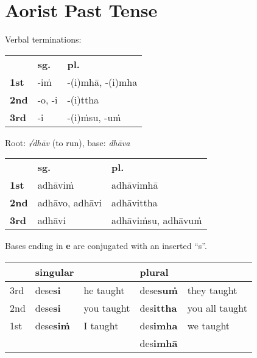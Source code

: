 \documentclass[a4paper]{memoir}
\begin{document}
\section{Aorist Past Tense}
\label{sec:orgbe4d456}

{\centering\par
\begin{multicols}{2}

Verbal terminations:

\begin{center}
\begin{tabular}{lll}
 & \textbf{sg.} & \textbf{pl.}\\[0pt]
\textbf{1st} & -iṁ & -(i)mhā, -(i)mha\\[0pt]
\textbf{2nd} & -o, -i & -(i)ttha\\[0pt]
\textbf{3rd} & -i & -(i)ṁsu, -uṁ\\[0pt]
\end{tabular}
\end{center}

\columnbreak

Root: \emph{√dhāv} (to run), base: \emph{dhāva}

\begin{center}
\begin{tabular}{lll}
 & \textbf{sg.} & \textbf{pl.}\\[0pt]
\textbf{1st} & adhāviṁ & adhāvimhā\\[0pt]
\textbf{2nd} & adhāvo, adhāvi & adhāvittha\\[0pt]
\textbf{3rd} & adhāvi & adhāviṁsu, adhāvuṁ\\[0pt]
\end{tabular}
\end{center}

\end{multicols}
\par}

Bases ending in \textbf{e} are conjugated with an inserted ``s''.

\begin{center}
\begin{tabular}{lllll}
 & singular &  & plural & \\[0pt]
\hline
3rd & dese\textbf{si} & he taught & dese\textbf{suṁ} & they taught\\[0pt]
2nd & dese\textbf{si} & you taught & des\textbf{ittha} & you all taught\\[0pt]
1st & dese\textbf{siṁ} & I taught & des\textbf{imha} & we taught\\[0pt]
 &  &  & des\textbf{imhā} & \\[0pt]
\end{tabular}
\end{center}
\end{document}
